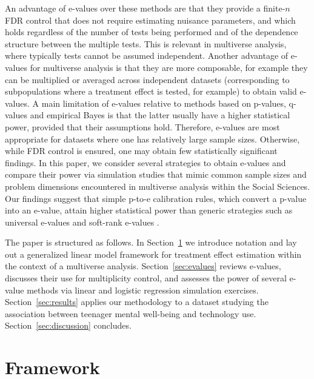 \documentclass[pdflatex,sn-mathphys-num]{sn-jnl}%
\theoremstyle{thmstyleone}%
\theoremstyle{thmstyletwo}%
\theoremstyle{thmstylethree}%
\begin{document}
An advantage of e-values over these methods are that they provide a finite-$n$ FDR control that does not require estimating nuisance parameters, and which holds regardless of the number of tests being performed and of the dependence structure between the multiple tests. This is relevant in multiverse analysis, where typically tests cannot be assumed independent.
Another advantage of e-values for multiverse analysis is that they are more composable, for example they can be multiplied or averaged across independent datasets (corresponding to subpopulations where a treatment effect is tested, for example) to obtain valid e-values.
A main limitation of e-values relative to methods based on p-values, q-values and empirical Bayes is that the latter usually have a higher statistical power, provided that their assumptions hold. 
Therefore, e-values are most appropriate for datasets where one has relatively large sample sizes. Otherwise, while FDR control is ensured, one may obtain few statistically significant findings. In this paper, we consider several strategies to obtain e-values and compare their power via simulation studies that mimic common sample sizes and problem dimensions encountered in multiverse analysis within the Social Sciences. Our findings suggest that simple p-to-e calibration rules, which convert a p-value into an e-value, attain higher statistical power than generic strategies such as universal e-values \citep{wasserman:2020} and soft-rank e-values \citep{koning:2023}. 


The paper is structured as follows. In Section~\ref{sec:framework} we introduce notation and lay out a generalized linear model framework for treatment effect estimation within the context of a multiverse analysis.
Section~\ref{sec:evalues} reviews e-values, discusses their use for multiplicity control, and assesses the power of several e-value methods via linear and logistic regression simulation exercises.
Section~\ref{sec:results} applies our methodology to a dataset studying the association between teenager mental well-being and technology use.
Section~\ref{sec:discussion} concludes.


\section{Framework}
\label{sec:framework}
\end{document}
